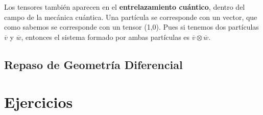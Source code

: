 \documentclass[palatino, bibnumbers]{apuntes}
\begin{document}
\begin{example}Los tensores también aparecen en el \textbf{entrelazamiento cuántico}, dentro del campo de la mecánica cuántica.
Una partícula se corresponde con un vector, que como sabemos se corresponde con un tensor (1,0). Pues si tenemos dos partículas $\overline{v}$ y $\overline{w}$, entonces el sistema formado por ambas partículas es  $\overline{v}\otimes\overline{w}$.
\section{Repaso de Geometría Diferencial}
\end{example}
\appendix


\chapter{Ejercicios}



{}
\printindex
\end{document}

